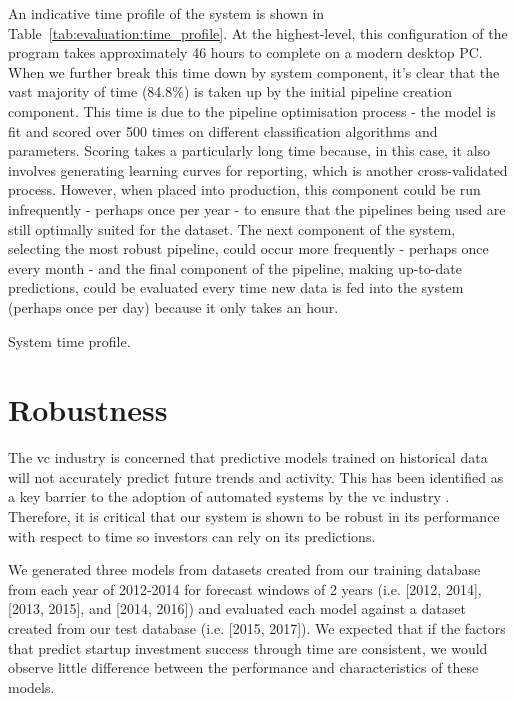 ﻿\documentclass[../thesis/thesis.tex]{subfiles}
\begin{document}
An indicative time profile of the system is shown in Table~\ref{tab:evaluation:time_profile}. At the highest-level, this configuration of the program takes approximately 46 hours to complete on a modern desktop PC. When we further break this time down by system component, it's clear that the vast majority of time (84.8\%) is taken up by the initial pipeline creation component. This time is due to the pipeline optimisation process - the model is fit and scored over 500 times on different classification algorithms and parameters. Scoring takes a particularly long time because, in this case, it also involves generating learning curves for reporting, which is another cross-validated process. However, when placed into production, this component could be run infrequently - perhaps once per year - to ensure that the pipelines being used are still optimally suited for the dataset. The next component of the system, selecting the most robust pipeline, could occur more frequently - perhaps once every month - and the final component of the pipeline, making up-to-date predictions, could be evaluated every time new data is fed into the system (perhaps once per day) because it only takes an hour.

\begin{table}[!htb] %
    \centering
    \scalebox{0.9}{}
    \caption[System time profile]{System time profile.}
    \label{tab:evaluation:time_profile}
\end{table}

\section{Robustness}

The \gls{vc} industry is concerned that predictive models trained on historical data will not accurately predict future trends and activity. This  has been identified as a key barrier to the adoption of automated systems by the \gls{vc} industry \cite{stone2014}. Therefore, it is critical that our system is shown to be robust in its performance with respect to time so investors can rely on its predictions.

We generated three models from datasets created from our training database from each year of 2012-2014 for forecast windows of 2 years (i.e. [2012, 2014], [2013, 2015], and [2014, 2016]) and evaluated each model against a dataset created from our test database (i.e. [2015, 2017]). We expected that if the factors that predict startup investment success through time are consistent, we would observe little difference between the performance and characteristics of these models.
\end{document}
